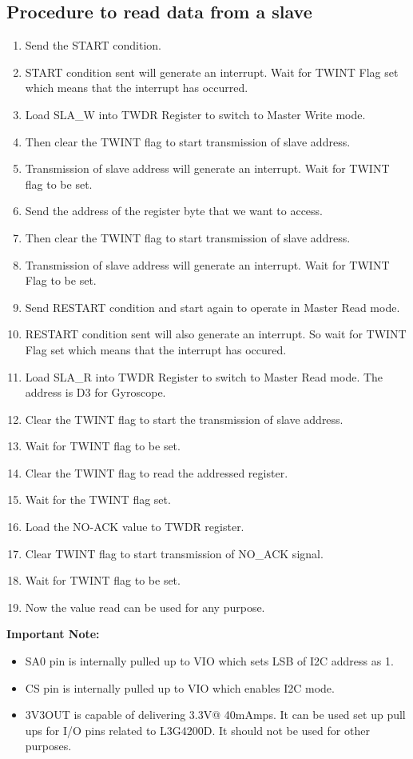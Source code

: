 \documentclass[a4paper,12 pt]{article}
\begin{document}
\subsection{Procedure to read data from a slave}
\begin{enumerate}
\item Send the START condition.
\item START condition sent will generate an interrupt. Wait for TWINT Flag set which means that the interrupt has occurred.
\item Load SLA\_W into TWDR Register to switch to Master Write mode.
\item Then clear the TWINT flag to start transmission of slave address.
\item Transmission of slave address will generate an interrupt. Wait for TWINT flag to be set. 
\item Send  the address of the register byte that we want to access.
\item Then clear the TWINT flag to start transmission of slave address.
\item Transmission of slave address will generate an interrupt. Wait for TWINT Flag to be set.
\item Send RESTART condition and start again to operate in Master Read mode.
\item RESTART condition sent will also generate an interrupt. So wait for TWINT Flag set which means that the interrupt has occured.
\item Load SLA\_R into TWDR Register to switch to Master Read mode. The address is D3 for Gyroscope.
\item Clear the TWINT flag to start the transmission of slave address.
\item Wait for TWINT flag to be set.
\item Clear the TWINT flag to read the addressed register.
\item Wait for the TWINT flag set.
\item Load the NO-ACK value to TWDR register.
\item Clear TWINT flag to start transmission of NO\_ACK signal.
\item Wait for TWINT flag to be set.
\item Now the value read can be used for any purpose.



\end{enumerate}

\textbf{Important Note:}
\begin{itemize}
\item SA0 pin is internally pulled up to VIO which sets LSB of I2C address as 1.
\item CS pin is internally pulled up to VIO which enables I2C mode.
\item 3V3OUT is capable of delivering 3.3V@ 40mAmps. It can be used set up pull ups for I/O pins related to L3G4200D. It should not be used for other purposes.
\end{itemize}
\end{document}
